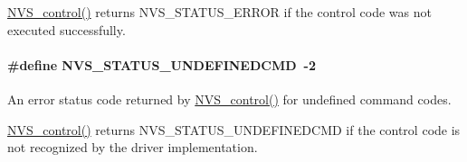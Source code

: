 \hyperlink{_n_v_s_8h_adb26bd05e4f063191411ac5ad968b1d9}{N\+V\+S\+\_\+control()} returns N\+V\+S\+\_\+\+S\+T\+A\+T\+U\+S\+\_\+\+E\+R\+R\+O\+R if the control code was not executed successfully. 
\paragraph[{N\+V\+S\+\_\+\+S\+T\+A\+T\+U\+S\+\_\+\+U\+N\+D\+E\+F\+I\+N\+E\+D\+C\+M\+D}]{\setlength{\rightskip}{0pt plus 5cm}\#define N\+V\+S\+\_\+\+S\+T\+A\+T\+U\+S\+\_\+\+U\+N\+D\+E\+F\+I\+N\+E\+D\+C\+M\+D~-\/2}\label{group___n_v_s___s_t_a_t_u_s_gac8aa59663f65af4fa564a3a83cd7d6e1}


An error status code returned by \hyperlink{_n_v_s_8h_adb26bd05e4f063191411ac5ad968b1d9}{N\+V\+S\+\_\+control()} for undefined command codes. 

\hyperlink{_n_v_s_8h_adb26bd05e4f063191411ac5ad968b1d9}{N\+V\+S\+\_\+control()} returns N\+V\+S\+\_\+\+S\+T\+A\+T\+U\+S\+\_\+\+U\+N\+D\+E\+F\+I\+N\+E\+D\+C\+M\+D if the control code is not recognized by the driver implementation. 